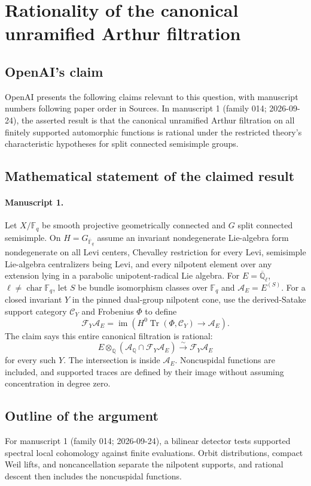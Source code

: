 \documentclass[11pt]{article}
\begin{document}
\section*{Rationality of the canonical unramified Arthur filtration}

\subsection{OpenAI's claim}
OpenAI presents the following claims relevant to this question, with manuscript numbers following paper order in Sources. In manuscript 1 (family 014; 2026-09-24), the asserted result is that the canonical unramified Arthur filtration on all finitely supported automorphic functions is rational under the restricted theory's characteristic hypotheses for split connected semisimple groups.

\subsection{Mathematical statement of the claimed result}
\paragraph{Manuscript 1.}
Let $X/\mathbb F_q$ be smooth projective geometrically connected and $G$ split connected semisimple. On $H=G_{\overline{\mathbb F}_q}$ assume an invariant nondegenerate Lie-algebra form nondegenerate on all Levi centers, Chevalley restriction for every Levi, semisimple Lie-algebra centralizers being Levi, and every nilpotent element over any extension lying in a parabolic unipotent-radical Lie algebra. For $E=\overline{\mathbb Q}_{\ell}$, $\ell\ne\operatorname{char}\mathbb F_q$, let $S$ be bundle isomorphism classes over $\mathbb F_q$ and $\mathcal A_E=E^{(S)}$. For a closed invariant $Y$ in the pinned dual-group nilpotent cone, use the derived-Satake support category $\mathcal C_Y$ and Frobenius $\Phi$ to define
\[
 \mathcal F_Y\mathcal A_E=\operatorname{im}(H^0\operatorname{Tr}(\Phi,\mathcal C_Y)\to\mathcal A_E).
\]
The claim says this entire canonical filtration is rational:
\[
 E\otimes_{\mathbb Q}(\mathcal A_{\mathbb Q}\cap\mathcal F_Y\mathcal A_E)
 \xrightarrow{\sim}\mathcal F_Y\mathcal A_E
\]
for every such $Y$. The intersection is inside $\mathcal A_E$. Noncuspidal functions are included, and supported traces are defined by their image without assuming concentration in degree zero.

\subsection{Outline of the argument}
For manuscript 1 (family 014; 2026-09-24), a bilinear detector tests supported spectral local cohomology against finite evaluations. Orbit distributions, compact Weil lifts, and noncancellation separate the nilpotent supports, and rational descent then includes the noncuspidal functions.
\end{document}

